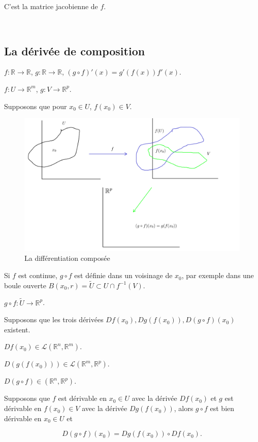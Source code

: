 \documentclass[french]{article}
\begin{document}
C'est la matrice jacobienne de $f$.

\

\subsection{La dérivée de composition}

$f : \mathbb{R} \to \mathbb{R}$, $g : \mathbb{R} \to \mathbb{R}$, $(g \circ f)'(x) = g'(f(x))f'(x)$.

$f : U \to \mathbb{R}^m$, $g : V \to \mathbb{R}^p$.

Supposons que pour $x_0 \in U$, $f(x_0) \in V$.

\begin{figure}[h!]
  \centering
  \includegraphics[scale=0.3]{figures/composition.png}
  \caption{La différentiation composée}
  \label{}
\end{figure}

Si $f$ est continue, $g \circ f$ est définie dans un voisinage de $x_0$, par exemple dans une boule ouverte $B(x_0, r) = \tilde{U} \subset U \cap f ^{-1} (V)$.

$g \circ f : \tilde{U} \to \mathbb{R}^p$.

Supposons que les trois dérivées $Df(x_0), Dg(f(x_0)), D(g \circ f)(x_0)$ existent.

$Df(x_0) \in \mathscr{L}(\mathbb{R}^n, \mathbb{R}^m) $.

$D(g(f(x_0))) \in \mathscr{L}(\mathbb{R}^m, \mathbb{R}^p) $.

$D(g \circ f) \in (\mathbb{R}^n, \mathbb{R}^p)$.

\begin{thm}
  Supposons que $f$ est dérivable en $x_0 \in U$ avec la dérivée $Df(x_0)$ et $g$ est dérivable en $f(x_0) \in V$ avec la dérivée $Dg(f(x_0))$, alors $g \circ f$ est bien dérivable en $x_0 \in U$ et

  $$ D(g \circ f)(x_0) = Dg(f(x_0)) \circ Df(x_0).$$
\end{thm}
\end{document}
